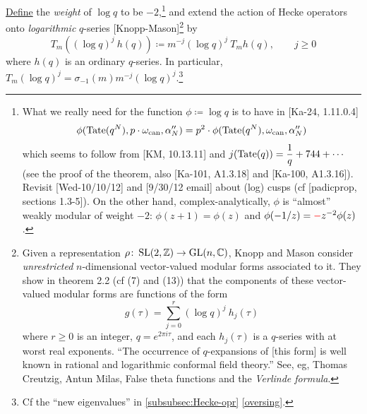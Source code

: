 \documentclass{rs}
\theoremstyle{definition}
\theoremstyle{remark}
\def\co{\colon\thinspace}
\newcommand{\mb}[1]{\mathbb{#1}}
\newcommand{\BC}{{\mb C}}
\newcommand{\BZ}{{\mb Z}}
\newcommand{\A}{\alpha}
\newcommand{\si}{\sigma}
\newcommand{\T}{\tau}
\newcommand{\ce}{\coloneqq}
\renewcommand{\=}{\approx}
\renewcommand{\-}{\sim}
\newcommand{\rd}[1]{\textcolor{red}{#1}}
\newcommand{\GL}{{\rm GL}}
\newcommand{\SL}{{\rm SL}}
\newcommand{\Tate}{{\rm Tate}}
\numberwithin{equation}{section}
\numberwithin{thm}{section}
\begin{document}
\underline{Define} the {\em weight} of $\log q$ to be $-2$,\footnote{What we really need for the function $\phi \ce \log q$ 
is to have in [Ka-24, 1.11.0.4] 
\[
 \phi(\Tate(q^N), p \cdot \omega_{\rm can}, \A_N'') = p^2 \cdot \phi(\Tate(q^N), \omega_{\rm can}, \A_N'') 
\]
which seems to follow from [KM, 10.13.11] and $j(\Tate(q)) = \dfrac{1}{q} + 744 + \cdots$ 
(see the proof of the theorem, also [Ka-101, A1.3.18] and [Ka-100, A1.3.16]).  
Revisit [Wed-10/10/12] and [9/30/12 email] about (log) cusps (cf [padicprop, sections 1.3-5]).  
On the other hand, complex-analytically, $\phi$ is ``almost'' weakly modular of weight $-2$: 
$\phi(z + 1) = \phi(z)$ and $\phi(-1/z) = \rd{-} z^{-2} \phi(z)$.  } 
and extend the action of Hecke operators onto 
{\em logarithmic} $q$-series [Knopp-Mason]\footnote{Given 
a representation $\rho \co \SL(2,\BZ) \to \GL(n,\BC)$, 
Knopp and Mason consider {\em unrestricted} $n$-dimensional vector-valued modular forms associated to it.  
They show in theorem 2.2 (cf (7) and (13)) that the components of these vector-valued modular forms are functions of the form 
\[
 g(\T) = \sum_{j=0}^r (\log q)^j ~\! h_j(\T) 
\]
where $r \geq 0$ is an integer, $q = e^{2 \pi i \T}$, and each $h_j(\T)$ is a $q$-series with at worst real exponents.  
``The occurrence of $q$-expansions of [this form] is well known in rational and logarithmic conformal field theory.''  
See, eg, Thomas Creutzig, Antun Milas, False theta functions and the {\em Verlinde formula}.  } by 
\[
 T_m \left( (\log q)^j ~\! h(q) \right) \ce m^{-j} (\log q)^j ~\! T_m h(q), \qquad j \geq 0 
\]
where $h(q)$ is an ordinary $q$-series.  
In particular, $T_m (\log q)^j = \si_{-1}(m) m^{-j} (\log q)^j$.\footnote{Cf 
the ``new eigenvalues'' in \ref{subsubsec:Hecke-opr} \eqref{oversing}.  }  
\end{document}
